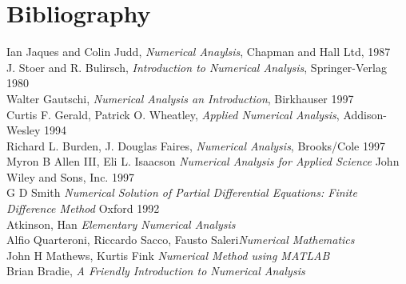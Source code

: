 \chapter{Bibliography}
\begin{thebibliography}{99}
 Ian Jaques and Colin Judd,
{\it Numerical Anaylsis}, Chapman and Hall Ltd, 1987
\\
 J. Stoer and R. Bulirsch,
{\it Introduction to Numerical Analysis}, Springer-Verlag 1980\\
 Walter Gautschi,
{\it Numerical Analysis an Introduction}, Birkhauser 1997\\
 Curtis F. Gerald, Patrick O. Wheatley,
{\it Applied Numerical Analysis}, Addison-Wesley 1994\\
 Richard L. Burden, J. Douglas Faires,
{\it Numerical Analysis}, Brooks/Cole 1997\\
 Myron B Allen III, Eli L. Isaacson
{\it Numerical Analysis for Applied Science} John Wiley and Sons, Inc. 1997\\
 G D Smith
{\it Numerical Solution of Partial Differential Equations: Finite Difference Method}
Oxford 1992\\
 Atkinson, Han
{\it Elementary Numerical Analysis }\\
 Alfio Quarteroni, Riccardo Sacco, Fausto Saleri{\it Numerical Mathematics}\\
 John H Mathews,  Kurtis Fink
{\it Numerical Method using MATLAB}\\
 Brian Bradie,  
{\it A Friendly Introduction to Numerical Analysis}\\

\end{thebibliography}
